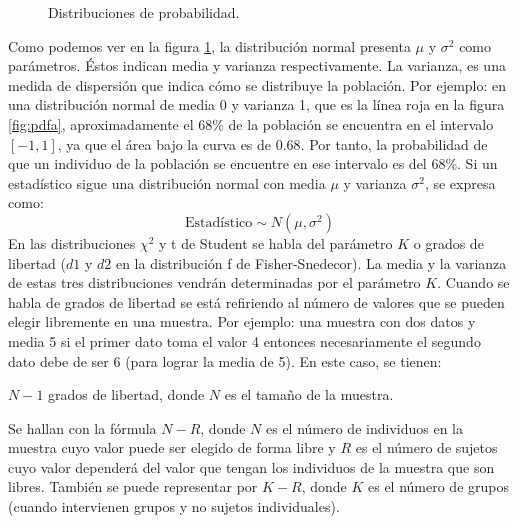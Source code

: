 \begin{figure}[h]
\centering
{}
\caption{Distribuciones de probabilidad.}
\label{fig:pdf}
\end{figure}
\newline
Como podemos ver en la figura \ref{fig:pdf}, la distribución normal presenta $\mu$ y $\sigma^2$ como parámetros.
Éstos indican media y varianza respectivamente. La varianza, es una medida de dispersión que indica cómo se
distribuye la población. Por ejemplo: en una distribución normal de media 0 y varianza 1, que es la línea roja
en la figura \ref{fig:pdfa}, aproximadamente el $68\%$ de la población se encuentra en el intervalo $[-1,1]$,
ya que el área bajo la curva es de 0.68. Por tanto, la probabilidad de que un individuo de la población se
encuentre en ese intervalo es del 68\%. Si un estadístico sigue una distribución normal con media $\mu$ y
varianza $\sigma^2$, se expresa como:
\[ \mbox{Estadístico} \sim N(\mu,\sigma^2) \]
En las distribuciones $\chi^2$ y t de Student se habla del parámetro $K$ o grados de libertad ($d1$ y $d2$  en
la distribución f de Fisher-Snedecor). La media y la varianza de estas tres distribuciones vendrán determinadas por
el parámetro $K$. Cuando se habla de grados de libertad se está refiriendo al número de valores que se pueden elegir
libremente en una muestra. Por ejemplo: una muestra con dos datos y media 5 si el primer dato toma el valor 4 entonces
necesariamente el segundo dato debe de ser 6 (para lograr la media de 5). En este caso, se tienen:
\begin{center}
$N - 1$ grados de libertad, donde $N$ es el tamaño de la muestra.
\end{center}
Se hallan con la fórmula $N-R$, donde $N$ es el número de individuos en la muestra cuyo valor puede ser elegido de
forma libre y $R$ es el número de sujetos cuyo valor dependerá del valor que tengan los individuos de la muestra que
son libres. También se puede representar por $K-R$, donde $K$ es el número de grupos (cuando intervienen grupos y
no sujetos individuales).

